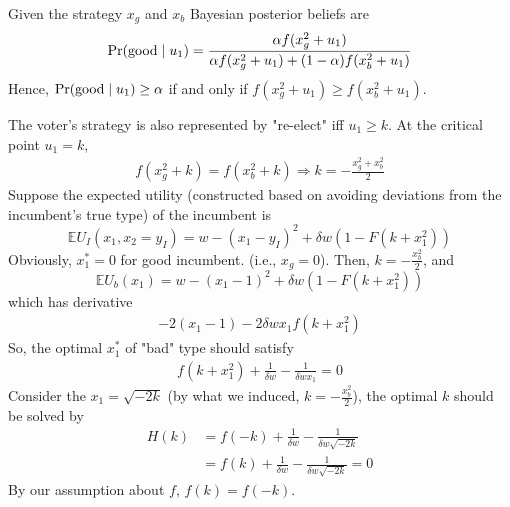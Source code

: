 \documentclass[11pt]{elegantbook}
\begin{document}
Given the strategy $x_g$ and $x_b$
Bayesian posterior beliefs are
\begin{equation}
    \begin{aligned}
        \textnormal{Pr}(\textnormal{good}\mid u_1)=\frac{\alpha f(x_g^2+u_1)}{\alpha f(x_g^2+u_1)+(1-\alpha)f(x_b^2+u_1)}
    \end{aligned}
    \nonumber
\end{equation}
Hence, $\textnormal{Pr}(\textnormal{good}\mid u_1)\geq \alpha$ if and only if $f(x_g^2+u_1)\geq f(x_b^2+u_1)$.

The voter's strategy is also represented by "re-elect" iff $u_1\geq k$. At the critical point $u_1=k$,
\begin{equation}
    \begin{aligned}
        f(x_g^2+k)=f(x_b^2+k) \Rightarrow k=-\frac{x_g^2+x_b^2}{2}
    \end{aligned}
    \nonumber
\end{equation}
Suppose the expected utility (constructed based on avoiding deviations from the incumbent's true type) of the incumbent is $$\mathbb{E}U_I(x_1,x_2=y_I)=w-(x_1-y_I)^2+\delta w\left(1-F(k+x_1^2)\right)$$
Obviously, $x_1^*=0$ for good incumbent. (i.e., $x_g=0$). Then, $k=-\frac{x_b^2}{2}$, and
$$\mathbb{E}U_b(x_1)=w-(x_1-1)^2+\delta w\left(1-F(k+x_1^2)\right)$$
which has derivative
\begin{equation}
    \begin{aligned}
        -2(x_1-1)-2\delta w x_1 f(k+x_1^2)
    \end{aligned}
    \nonumber
\end{equation}
So, the optimal $x_1^*$ of "bad" type should satisfy
\begin{equation}
    \begin{aligned}
        f(k+x_1^2)+\frac{1}{\delta w}-\frac{1}{\delta w x_1}=0
    \end{aligned}
    \nonumber
\end{equation}
Consider the $x_1=\sqrt{-2k}$ (by what we induced, $k=-\frac{x_b^2}{2}$), the optimal $k$ should be solved by
\begin{equation}
    \begin{aligned}
        H(k)&=f(-k)+\frac{1}{\delta w}-\frac{1}{\delta w \sqrt{-2k}}\\
        &=f(k)+\frac{1}{\delta w}-\frac{1}{\delta w \sqrt{-2k}}=0
    \end{aligned}
    \nonumber
\end{equation}
By our assumption about $f$, $f(k)=f(-k)$.
\end{document}
